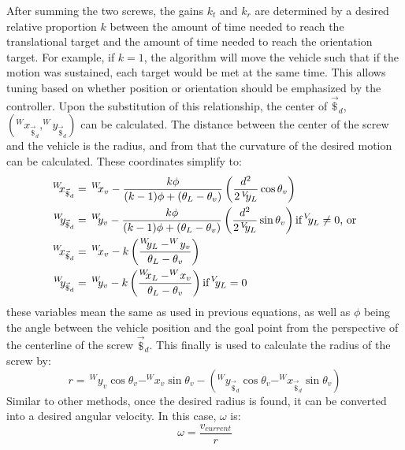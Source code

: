 \documentclass[mla7]{mla}
\begin{document}
\begin{paper}
After summing the two screws, the gains $k_t$ and $k_r$ are determined by a desired relative proportion $k$ between the amount of time needed to reach the translational target and the amount of time needed to reach the orientation target. For example, if $k=1$, the algorithm will move the vehicle such that if the motion was sustained, each target would be met at the same time. This allows tuning based on whether position or orientation should be emphasized by the controller. Upon the substitution of this relationship, the center of $\vec{\$}_d$, $(^W\!\!x_{\vec{\$}_d}, ^W\!\!y_{\vec{\$}_d})$ can be calculated. The distance between the center of the screw and the vehicle is the radius, and from that the curvature of the desired motion can be calculated. These coordinates simplify to:
\begin{subequations}
\begin{align}
^W\!\!x_{\vec{\$}_d} &=\,^W\!\!x_v - \frac{k\phi}{(k-1)\phi+(\theta_L-\theta_v)} \left( \frac{d^2}{2\,^V\!\!y_L}\cos{\theta_v} \right)\\
^W\!\!y_{\vec{\$}_d} &=\,^W\!\!y_v - \frac{k\phi}{(k-1)\phi+(\theta_L-\theta_v)} \left( \frac{d^2}{2\,^V\!\!y_L}\sin{\theta_v} \right)
\text{if\,}^V\!\!y_L\neq0 \text{, or}\\
^W\!\!x_{\vec{\$}_d} &=\,^W\!\!x_v - k \left( \frac{^W\!\!y_L-^W\!y_v}{\theta_L-\theta_v} \right) \\
^W\!\!y_{\vec{\$}_d} &=\,^W\!\!y_v - k \left( \frac{^W\!\!x_L-^W\!x_v}{\theta_L-\theta_v} \right) 
\text{if\,} ^V\!\!y_L=0
\end{align}
\end{subequations}
these variables mean the same as used in previous equations, as well as $\phi$ being the angle between the vehicle position and the goal point from the perspective of the centerline of the screw $\vec{\$}_d$.  This finally is used to calculate the radius of the screw by:
\begin{equation}
r= \,^W\!\!y_v\cos{\theta_v}-^W\!\!x_v\sin{\theta_v}-\left(^W\!\!y_{\vec{\$}_d}\cos{\theta_v}-^W\!\!x_{\vec{\$}_d}\sin{\theta_v}\right)
\end{equation}
Similar to other methods, once the desired radius is found, it can be converted into a desired angular velocity. In this case, $\omega$ is:
\begin{equation}
\omega=\frac{v_{current}}{r}
\end{equation}


\end{paper}
\end{document}
